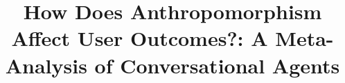 \documentclass[manuscript,anonymous,sigconf]{acmart}
\begin{document}
\title[The Effects of Anthropomorphism in Conversational Agents]{How Does Anthropomorphism Affect User Outcomes?: A Meta-Analysis of Conversational Agents}








\end{document}

